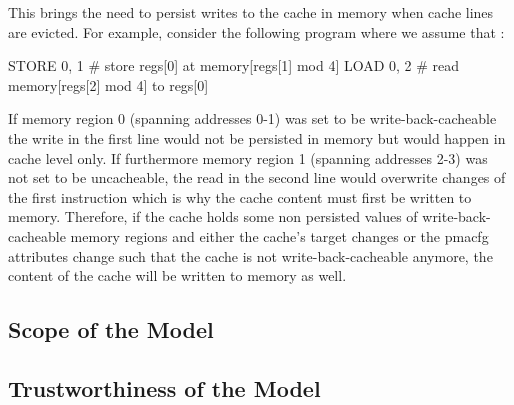 This brings the need to persist writes to the cache in memory when cache lines are evicted.
For example, consider the following program where we assume that :
\begin{assmblr}
STORE 0, 1  # store regs[0] at memory[regs[1] mod 4]
LOAD 0, 2   # read memory[regs[2] mod 4] to regs[0]
\end{assmblr}

If memory region 0 (spanning addresses 0-1) was set to be write-back-cacheable the write in the first line would not be persisted in memory but would happen in cache level only.
If furthermore memory region 1 (spanning addresses 2-3) was not set to be uncacheable, the read in the second line would overwrite changes of the first instruction which is why the cache content must first be written to memory.
Therefore, if the cache holds some non persisted values of write-back-cacheable memory regions and either the cache's target changes or the \gls{pmacfg} attributes change such that the cache is not write-back-cacheable anymore, the content of the cache will be written to memory as well.

\subsection{Scope of the Model}
\label{sec:model-scope}

\subsection{Trustworthiness of the Model}
